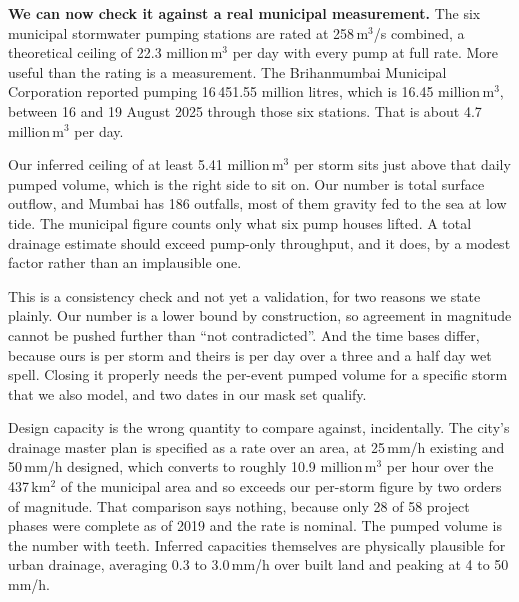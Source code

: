 \textbf{We can now check it against a real municipal measurement.} The six municipal stormwater
pumping stations are rated at 258\,m$^3$/s combined, a theoretical ceiling of 22.3 million\,m$^3$
per day with every pump at full rate. More useful than the rating is a measurement. The Brihanmumbai
Municipal Corporation reported pumping 16\,451.55 million litres, which is 16.45 million\,m$^3$,
between 16 and 19 August 2025 through those six stations. That is about 4.7 million\,m$^3$ per day.

Our inferred ceiling of at least 5.41 million\,m$^3$ per storm sits just above that daily pumped
volume, which is the right side to sit on. Our number is total surface outflow, and Mumbai has 186
outfalls, most of them gravity fed to the sea at low tide. The municipal figure counts only what six
pump houses lifted. A total drainage estimate should exceed pump-only throughput, and it does, by a
modest factor rather than an implausible one.

This is a consistency check and not yet a validation, for two reasons we state plainly. Our number
is a lower bound by construction, so agreement in magnitude cannot be pushed further than ``not
contradicted''. And the time bases differ, because ours is per storm and theirs is per day over a
three and a half day wet spell. Closing it properly needs the per-event pumped volume for a specific
storm that we also model, and two dates in our mask set qualify.

Design capacity is the wrong quantity to compare against, incidentally. The city's drainage master
plan is specified as a rate over an area, at 25\,mm/h existing and 50\,mm/h designed, which converts
to roughly 10.9 million\,m$^3$ per hour over the 437\,km$^2$ of the municipal area and so exceeds
our per-storm figure by two orders of magnitude. That comparison says nothing, because only 28 of
58 project phases were complete as of 2019 and the rate is nominal. The pumped volume is the number
with teeth. Inferred capacities themselves are physically plausible for urban drainage, averaging
0.3 to 3.0\,mm/h over built land and peaking at 4 to 50\,mm/h.
